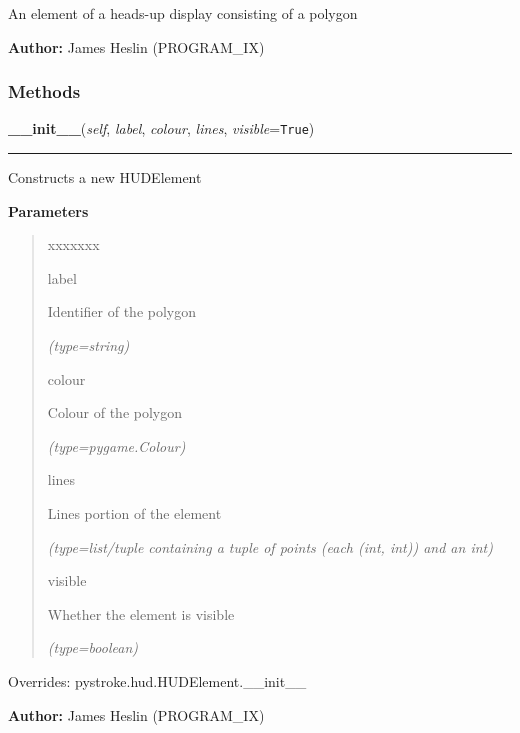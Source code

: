 An element of a heads-up display consisting of a polygon

\textbf{Author:} James Heslin (PROGRAM\_IX)





  \subsubsection{Methods}

    \vspace{0.5ex}

\hspace{.8\funcindent}\begin{boxedminipage}{\funcwidth}

    \raggedright \textbf{\_\_init\_\_}(\textit{self}, \textit{label}, \textit{colour}, \textit{lines}, \textit{visible}={\tt True})

    \vspace{-1.5ex}

    \rule{\textwidth}{0.5\fboxrule}
\setlength{\parskip}{2ex}
    Constructs a new HUDElement

\setlength{\parskip}{1ex}
      \textbf{Parameters}
      \vspace{-1ex}

      \begin{quote}
        \begin{Ventry}{xxxxxxx}

          \item[label]

          Identifier of the polygon

            {\it (type=string)}

          \item[colour]

          Colour of the polygon

            {\it (type=pygame.Colour)}

          \item[lines]

          Lines portion of the element

            {\it (type=list/tuple containing a tuple of points (each (int, int)) and an int)}

          \item[visible]

          Whether the element is visible

            {\it (type=boolean)}

        \end{Ventry}

      \end{quote}

      Overrides: pystroke.hud.HUDElement.\_\_init\_\_

\textbf{Author:} James Heslin (PROGRAM\_IX)



    \end{boxedminipage}

